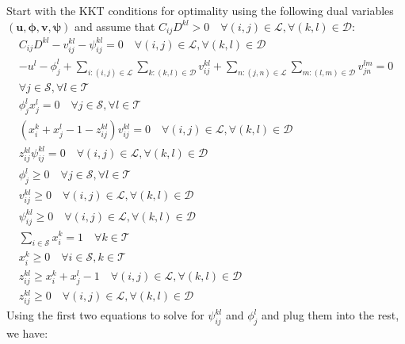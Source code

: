 Start with the KKT conditions for optimality using the following dual variables $(\mathbf{u},\boldsymbol{\phi},\mathbf{v},\boldsymbol{\psi})$ and assume that $C_{ij}D^{kl}>0\quad\forall (i,j)\in\mathcal{L}, \forall(k,l)\in\mathcal{D}$:
\begin{subequations}\label{eq:opt_stage_lin1_kkt1}
	\begin{align}
		C_{ij}D^{kl}-v_{ij}^{kl}-\psi_{ij}^{kl} =0 \quad \forall (i,j)\in\mathcal{L}, \forall(k,l)\in\mathcal{D} \label{eq:opt_stage_lin1_kkt1_stat1} \\
		-u^l-\phi_j^l+\sum_{i:(i,j)\in\mathcal{L}}\sum_{k:(k,l)\in\mathcal{D}}v_{ij}^{kl}+\sum_{n:(j,n)\in\mathcal{L}}\sum_{m:(l,m)\in\mathcal{D}}v_{jn}^{lm} =0 \nonumber\\
		\forall j\in\mathcal{S},\forall l\in\mathcal{T} \label{eq:opt_stage_lin1_kkt1_stat2} \\
		\phi_j^lx_j^l = 0 \quad \forall j\in\mathcal{S},\forall l\in\mathcal{T} \label{eq:opt_stage_lin1_kkt1_cs1} \\
		(x_i^k+x_j^l-1-z_{ij}^{kl})v_{ij}^{kl} = 0 \quad \forall (i,j)\in\mathcal{L}, \forall(k,l)\in\mathcal{D} \label{eq:opt_stage_lin1_kkt1_cs2} \\
		z_{ij}^{kl}\psi_{ij}^{kl} = 0 \quad \forall (i,j)\in\mathcal{L}, \forall(k,l)\in\mathcal{D} \label{eq:opt_stage_lin1_kkt1_cs3} \\
		\phi_j^l \geq 0  \quad \forall j\in\mathcal{S},\forall l\in\mathcal{T} \label{eq:opt_stage_lin1_kkt1_dual1} \\
		v_{ij}^{kl} \geq 0 \quad \forall (i,j)\in\mathcal{L}, \forall(k,l)\in\mathcal{D} \label{eq:opt_stage_lin1_kkt1_dual2} \\
		\psi_{ij}^{kl} \geq 0 \quad \forall (i,j)\in\mathcal{L}, \forall(k,l)\in\mathcal{D} \label{eq:opt_stage_lin1_kkt1_dual3} \\
		\sum_{i\in\mathcal{S}}x_i^k = 1 \quad \forall k\in\mathcal{T} \label{eq:opt_stage_lin1_kkt1_prim1} \\
		x_i^k \geq 0 \quad \forall i\in\mathcal{S},k\in\mathcal{T} \label{eq:opt_stage_lin1_kkt1_prim2} \\
		z_{ij}^{kl} \geq x_i^k+x_j^l-1 \quad \forall (i,j)\in\mathcal{L}, \forall(k,l)\in\mathcal{D} \label{eq:opt_stage_lin1_kkt1_prim3} \\
		z_{ij}^{kl} \geq 0 \quad \forall (i,j)\in\mathcal{L}, \forall(k,l)\in\mathcal{D} \label{eq:opt_stage_lin1_kkt1_prim4}
	\end{align}
\end{subequations}
Using the first two equations to solve for $\psi_{ij}^{kl}$ and $\phi_j^l$ and plug them into the rest, we have:

